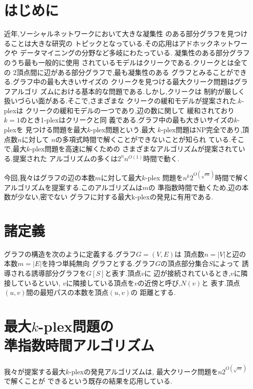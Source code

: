 \documentclass[a4j,twoside]{jarticle}
\begin{document}
\twocolumn[\vspace*{9mm}]     %
\begin{論文概要}              %
\setcounter{page}{2}          %

\section{はじめに}
近年,ソーシャルネットワークにおいて大きな凝集性
のある部分グラフを見つけることは大きな研究の
トピックとなっている.その応用はアドホックネットワークや
データマイニングの分野など多岐にわたっている.
凝集性のある部分グラフのうち最も一般的に使用
されているモデルはクリークである.クリークとは全ての
2頂点間に辺がある部分グラフで,最も凝集性のある
グラフとみることができる.グラフ中の最も大きいサイズの
クリークを見つける最大クリーク問題はグラフアルゴリ
ズムにおける基本的な問題である.しかし,クリークは
制約が厳しく扱いづらい面がある.そこで,さまざまな
クリークの緩和モデルが提案された.$k$-plexは
クリークの緩和モデルの一つであり,辺の数に関して
緩和されており$k=1$のとき1-plexはクリークと同
義である.グラフ中の最も大きいサイズの$k$-plexを
見つける問題を最大$k$-plex問題という.最大
$k$-plex問題はNP完全であり,頂点数$n$に対して
$n$の多項式時間で解くことができないことが知られ
ている.そこで,最大$k$-plex問題を高速に解くための
さまざまなアルゴリズムが提案されている.提案された
アルゴリズムの多くは$2^{n}n^{O(1)}$時間で動く.

今回,我々はグラフの辺の本数$m$に対して最大$k$-plex
問題を$n^{k }2^{O(\sqrt{m})}$時間で解く
アルゴリズムを提案する.このアルゴリズムは$m$の
準指数時間で動くため,辺の本数が少ない,密でない
グラフに対する最大k-plexの発見に有用である.  

\section{諸定義}
グラフの構造を次のように定義する.グラフ$G=(V,E)$は
頂点数$n=|V|$と辺の本数$m=|E|$を持つ単純無向
グラフとする.グラフ$G$の頂点部分集合$S$によって
誘導される誘導部分グラフを$G[S]$と表す.頂点$v$に
辺が接続されているとき,$v$に隣接しているといい,
$v$に隣接している頂点を$v$の近傍と呼び,$N(v)$と
表す.頂点$(u,v)$間の最短パスの本数を頂点$(u,v)$の
距離とする.

\section{最大$k$-plex問題の \\ 準指数時間アルゴリズム}
我々が提案する最大$k$-plexの発見アルゴリズムは,
最大クリーク問題を$n2^{O(\sqrt{m})}$で解くことが
できるという既存の結果を応用している. \cite{fomin2010exact}




\end{論文概要}
\end{document}
